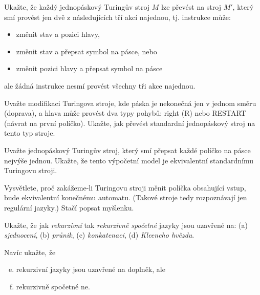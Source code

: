 \documentclass[a4paper,12pt]{amsart}
\begin{document}
\begin{problem}

    Ukažte, že každý jednopáskový Turingův stroj $M$ lze převést na stroj $M'$, který smí provést jen dvě z následujících tří akcí najednou, tj. instrukce může: 
    \begin{itemize}
        \item změnit stav a pozici hlavy,
        \item změnit stav a přepsat symbol na pásce, nebo
        \item změnit pozici hlavy a přepsat symbol na pásce
    \end{itemize}
    ale žádná instrukce nesmí provést všechny tři akce najednou.

\end{problem}


\begin{problem}
    Uvažte modifikaci Turingova stroje, kde páska je nekonečná jen v jednom směru (doprava), a hlava může provést dva typy pohybů: right (R) nebo RESTART (návrat na první políčko). Ukažte, jak převést standardní jednopáskový stroj na tento typ stroje.
\end{problem}
        

\begin{problem}

    Uvažte jednopáskový Turingův stroj, který smí přepsat každé políčko na pásce nejvýše jednou. Ukažte, že tento výpočetní model je ekvivalentní standardnímu Turingovu stroji.

\end{problem}
    

\begin{problem}

    Vysvětlete, proč zakážeme-li Turingovu stroji měnit políčka obsahující vstup, bude ekvivalentní konečnému automatu. (Takové stroje tedy rozpoznávají jen regulární jazyky.) Stačí popsat myšlenku.

\end{problem}
    

\begin{problem}
    
    Ukažte, že jak \emph{rekurzivní} tak \emph{rekurzivně spočetné} jazyky jsou uzavřené na:    
    (a) \emph{sjednocení}, (b) \emph{průnik}, (c) \emph{konkatenaci}, (d) \emph{Kleeneho hvězdu}.
    
    Navíc ukažte, že
    \begin{enumerate}[(a)]
    \setcounter{enumi}{4}
    \item rekurzivní jazyky jsou uzavřené na doplněk, ale 
    \item rekurzivně spočetné ne.
    \end{enumerate}

\end{problem}
\end{document}

